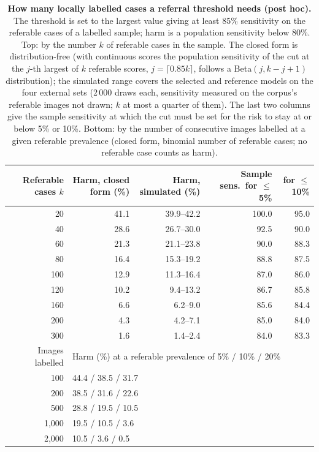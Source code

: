 \begin{table}[h]
\caption{\textbf{How many locally labelled cases a referral threshold needs (post hoc).} The threshold is set to the largest value giving at least 85\% sensitivity on the referable cases of a labelled sample; harm is a population sensitivity below 80\%. Top: by the number $k$ of referable cases in the sample. The closed form is distribution-free (with continuous scores the population sensitivity of the cut at the $j$-th largest of $k$ referable scores, $j=\lceil0.85k\rceil$, follows a Beta$(j,k-j+1)$ distribution); the simulated range covers the selected and reference models on the four external sets (2\,000 draws each, sensitivity measured on the corpus's referable images not drawn; $k$ at most a quarter of them). The last two columns give the sample sensitivity at which the cut must be set for the risk to stay at or below 5\% or 10\%. Bottom: by the number of consecutive images labelled at a given referable prevalence (closed form, binomial number of referable cases; no referable case counts as harm).}\label{tab:samplesize}
\centering\scriptsize
\begin{tabular}{@{}rrrrr@{}}
\toprule
Referable cases $k$ & Harm, closed form (\%) & Harm, simulated (\%) & Sample sens.\ for $\leq$5\% & for $\leq$10\% \\
\midrule
20 & 41.1 & 39.9--42.2 & 100.0 & 95.0 \\
40 & 28.6 & 26.7--30.0 & 92.5 & 90.0 \\
60 & 21.3 & 21.1--23.8 & 90.0 & 88.3 \\
80 & 16.4 & 15.3--19.2 & 88.8 & 87.5 \\
100 & 12.9 & 11.3--16.4 & 87.0 & 86.0 \\
120 & 10.2 & 9.4--13.2 & 86.7 & 85.8 \\
160 & 6.6 & 6.2--9.0 & 85.6 & 84.4 \\
200 & 4.3 & 4.2--7.1 & 85.0 & 84.0 \\
300 & 1.6 & 1.4--2.4 & 84.0 & 83.3 \\
\midrule
Images labelled & \multicolumn{4}{l}{Harm (\%) at a referable prevalence of 5\% / 10\% / 20\%} \\
\midrule
100 & \multicolumn{4}{l}{44.4 / 38.5 / 31.7} \\
200 & \multicolumn{4}{l}{38.5 / 31.6 / 22.6} \\
500 & \multicolumn{4}{l}{28.8 / 19.5 / 10.5} \\
1,000 & \multicolumn{4}{l}{19.5 / 10.5 / 3.6} \\
2,000 & \multicolumn{4}{l}{10.5 / 3.6 / 0.5} \\
\bottomrule
\end{tabular}
\end{table}
